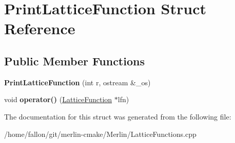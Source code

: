 \hypertarget{structPrintLatticeFunction}{}\section{Print\+Lattice\+Function Struct Reference}
\label{structPrintLatticeFunction}
\subsection*{Public Member Functions}
\begin{DoxyCompactItemize}
\item 
\mbox{\label{structPrintLatticeFunction_af50f51a22bb281bbb21520aa04f49fe6}} 
{\bfseries Print\+Lattice\+Function} (int r, ostream \&\+\_\+os)
\item 
\mbox{\label{structPrintLatticeFunction_a45c81e7de77360d41e55bc8f5cb262b3}} 
void {\bfseries operator()} (\hyperlink{classLatticeFunction}{Lattice\+Function} $\ast$lfn)
\end{DoxyCompactItemize}


The documentation for this struct was generated from the following file\+:\begin{DoxyCompactItemize}
\item 
/home/fallon/git/merlin-\/cmake/\+Merlin/Lattice\+Functions.\+cpp\end{DoxyCompactItemize}

